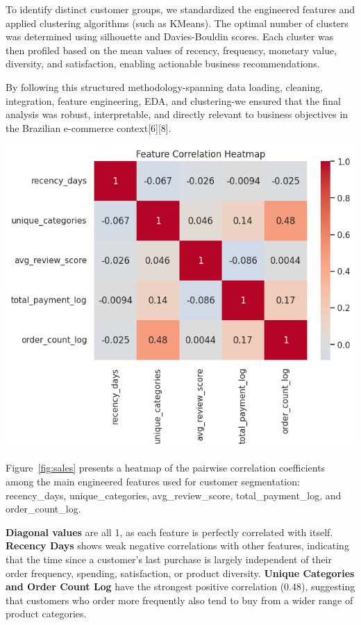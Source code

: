 \documentclass[a4paper]{article}
\begin{document}
\begin{multicols}{2}
To identify distinct customer groups, we standardized the engineered features and applied clustering algorithms (such as KMeans). The optimal number of clusters was determined using silhouette and Davies-Bouldin scores. Each cluster was then profiled based on the mean values of recency, frequency, monetary value, diversity, and satisfaction, enabling actionable business recommendations.

By following this structured methodology-spanning data loading, cleaning, integration, feature engineering, EDA, and clustering-we ensured that the final analysis was robust, interpretable, and directly relevant to business objectives in the Brazilian e-commerce context[6][8].


\noindent
\begin{minipage}{\columnwidth}
\centering
\includegraphics[width=1\textwidth]{plots/Feature-Correlation-Heatmap.png}
\label{fig:sales} 
\end{minipage}

Figure~\ref{fig:sales} presents a heatmap of the pairwise correlation coefficients among the main engineered features used for customer segmentation: recency\_days, unique\_categories, avg\_review\_score, total\_payment\_log, and order\_count\_log.

\textbf{Diagonal values} are all 1, as each feature is perfectly correlated with itself.
\textbf{Recency Days} shows weak negative correlations with other features, indicating that the time since a customer’s last purchase is largely independent of their order frequency, spending, satisfaction, or product diversity.
\textbf{Unique Categories and Order Count Log} have the strongest positive correlation (0.48), suggesting that customers who order more frequently also tend to buy from a wider range of product categories.


\end{multicols}
\end{document}
